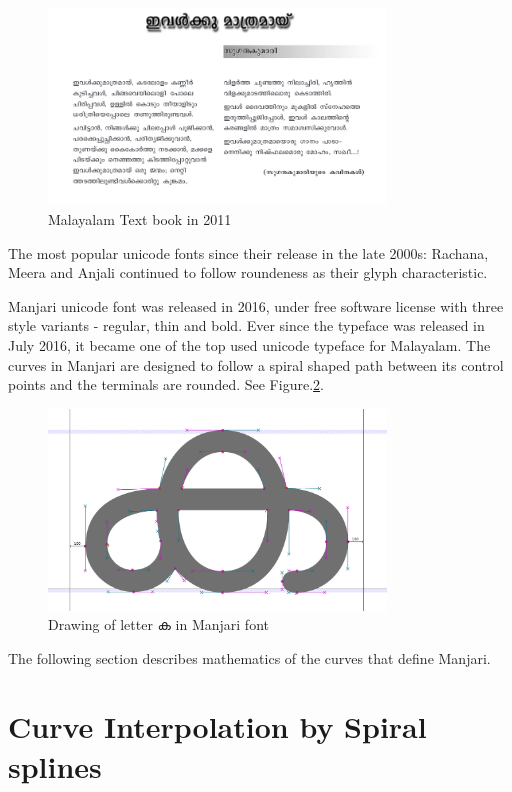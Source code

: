 \documentclass[10pt]{article}
\begin{document}
\begin{figure}
	\centering
	\includegraphics[width=0.8\textwidth]{images/2011-Malayalam-Textbook.png}
	\caption{Malayalam Text book in 2011}
	\label{maltextbook}
\end{figure}

 
 The most popular unicode fonts since their release in the late 2000s:  Rachana, Meera and Anjali continued to follow roundeness as their glyph characteristic. 

 
 Manjari unicode font was released in 2016,  under free software license with three style variants - regular, thin and bold. Ever since the typeface was released in July 2016, it became one of the top used unicode typeface for Malayalam. The curves in Manjari are designed to follow a spiral shaped path between its control points and the terminals are rounded. See Figure.\ref{manjari-ka}.
\begin{figure}
	\centering
	\includegraphics[width=0.8\textwidth]{images/Manjari-Ka.png}
	\caption{Drawing of letter {\manjari ക} in Manjari font}
	\label{manjari-ka}
\end{figure} 
 
 The following section describes mathematics of the curves that define Manjari. 
 


\section{Curve Interpolation by Spiral splines}
\end{document}

